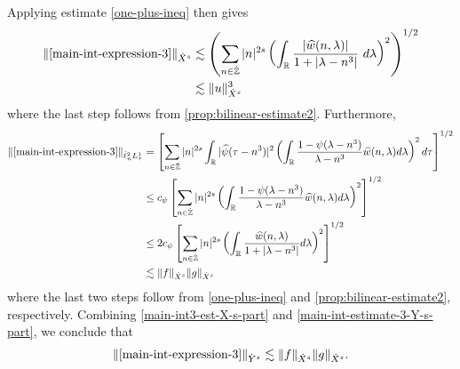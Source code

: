 \documentclass[12pt,reqno]{amsart}
\numberwithin{equation}{section}  %
\numberwithin{figure}{section}
\newcommand{\rr}{\mathbb{R}}
\newcommand{\zz}{\mathbb{Z}}
\newcommand{\zzdot}{\dot{\zz}}
\newcommand{\wh}{\widehat}
\theoremstyle{plain}
\theoremstyle{definition}
\theoremstyle{remark}
\begin{document}
%
%
Applying estimate \eqref{one-plus-ineq} then gives
%
\begin{equation}
	\label{main-int3-est-X-s-part}
	\begin{split}
		\| \eqref{main-int-expression-3} \|_{\dot{X}^s}
		& \lesssim \left( \sum_{n \in \zzdot} |n|^{2s}  \left ( \int_\rr
		\frac{|\wh{w}(n, \lambda)| }{1 + |\lambda - n^3|}
		 \ d\lambda \right )^2 \right)^{1/2}
		 \\
		& \lesssim \|u\|_{\dot{X}^s}^3
	\end{split}
\end{equation}
%
where the last step follows from \autoref{prop:bilinear-estimate2}.
Furthermore, 
%
%
\begin{equation}
	\label{main-int-estimate-3-Y-s-part}
	\begin{split}
		\|\eqref{main-int-expression-3}\|_{\dot{\ell}^2_n L^1_\tau}
		& = \left[ \sum_{n \in \zzdot} |n|^{2s} \int_{\rr} |
		\wh{\psi}(\tau - n^{3}) |^{2} \left( \int_{\rr}\frac{1 - \psi(\lambda -
		n^{3})}{\lambda - n^{3}} \wh{w}(n, \lambda) d \lambda \right)^{2} d \tau
		\right]^{1/2}
		\\
		& \le c_{\psi} \left[ \sum_{n \in \zzdot} |n|^{2s} \left(
		\int_{\rr} \frac{1 - \psi(\lambda - n^{3})}{\lambda - n^{3}}
		\wh{w}(n, \lambda) d \lambda
		\right)^{2}\right]^{1/2}
		\\
		& \le 2 c_{\psi} \left[ \sum_{n \in \zzdot} |n|^{2s} \left(
		\int_{\rr} \frac{\wh{w}(n, \lambda) }{1 + |\lambda - n^{3}|}
		d \lambda
		\right)^{2}\right]^{1/2}
		\\
		& \lesssim \|f\|_{\dot{X}^s} \|g\|_{\dot{X}^s} 
	\end{split}
\end{equation}
%
%
where the last two steps follow from \eqref{one-plus-ineq} and
\autoref{prop:bilinear-estimate2}, respectively. Combining
\eqref{main-int3-est-X-s-part} and \eqref{main-int-estimate-3-Y-s-part}, we
conclude that
%
%
\begin{equation}
	\label{main-int3-est}
	\begin{split}
		\|\eqref{main-int-expression-3}\|_{\dot{Y}^s} 
		\lesssim \|f\|_{\dot{X}^s} \|g\|_{\dot{X}^s}.
	\end{split}
\end{equation}
%
%
%
\end{document}
